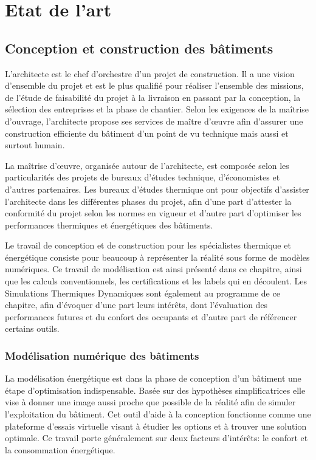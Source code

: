 \part{Etat de l'art}

\chapter{Conception et construction des bâtiments}

L'architecte est le chef d'orchestre d'un projet de construction. Il a une vision d'ensemble du projet et est le plus qualifié pour réaliser l'ensemble des missions, de l'étude de faisabilité du projet à la livraison en passant par la conception, la sélection des entreprises et la phase de chantier. Selon les exigences de la maîtrise d'ouvrage, l'architecte propose ses services de maître d'œuvre afin d'assurer une construction efficiente du bâtiment d'un point de vu technique mais aussi et surtout humain. 

La maîtrise d'œuvre, organisée autour de l'architecte, est composée selon les particularités des projets de bureaux d'études technique, d'économistes et d'autres partenaires. Les bureaux d'études thermique ont pour objectifs d'assister l'architecte dans les différentes phases du projet, afin d'une part d'attester la conformité du projet selon les normes en vigueur et d'autre part d'optimiser les performances thermiques et énergétiques des bâtiments.

Le travail de conception et de construction pour les spécialistes thermique et énergétique consiste pour beaucoup à représenter la réalité sous forme de modèles numériques. Ce travail de modélisation est ainsi présenté dans ce chapitre, ainsi que les calculs conventionnels, les certifications et les labels qui en découlent. Les Simulations Thermiques Dynamiques sont également au programme de ce chapitre, afin d'évoquer d'une part leurs intérêts, dont l'évaluation des performances futures et du confort des occupants et d'autre part de référencer certains outils.

\section{Modélisation numérique des bâtiments}

La modélisation énergétique est dans la phase de conception d'un bâtiment une étape d'optimisation indispensable. Basée sur des hypothèses simplificatrices elle vise à donner une image aussi proche que possible de la réalité afin de simuler l'exploitation du bâtiment. Cet outil d'aide à la conception fonctionne comme une plateforme d'essais virtuelle visant à étudier les options et à trouver une solution optimale. Ce travail porte généralement sur deux facteurs d'intérêts: le confort et la consommation énergétique.

